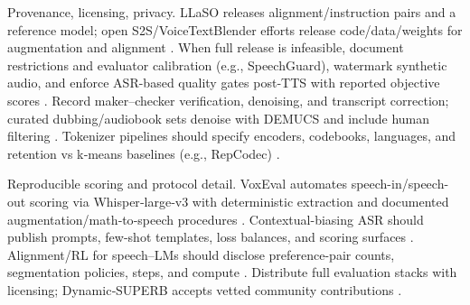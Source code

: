 \documentclass{article}
\begin{document}
Provenance, licensing, privacy. LLaSO releases alignment/instruction pairs and a reference model; open S2S/VoiceTextBlender efforts release code/data/weights for augmentation and alignment \cite{sun2025llasofoundationalframeworkreproduciblere,peng2025voicetextblenderaugmentinglargelanguagem}. When full release is infeasible, document restrictions and evaluator calibration (e.g., SpeechGuard), watermark synthetic audio, and enforce ASR-based quality gates post‑TTS with reported objective scores \cite{peri2024speechguardexploringadversarialrobustnes,zhao2024advancingspeechlanguagemodelsscalingsupe}. Record maker–checker verification, denoising, and transcript correction; curated dubbing/audiobook sets denoise with DEMUCS and include human filtering \cite{huang2023holisticcascadesystembenchmarkhumanevalu}. Tokenizer pipelines should specify encoders, codebooks, languages, and retention vs k‑means baselines (e.g., RepCodec) \cite{huang2024repcodecspeechrepresentationcodectokeniz}.

Reproducible scoring and protocol detail. VoxEval automates speech-in/speech-out scoring via Whisper‑large‑v3 with deterministic extraction and documented augmentation/math‑to‑speech procedures \cite{cui2025voxevalbenchmarkingknowledgeunderstandin}. Contextual-biasing ASR should publish prompts, few-shot templates, loss balances, and scoring surfaces \cite{sun2023contextualbiasingnamedentitieslargelangu}. Alignment/RL for speech–LMs should disclose preference-pair counts, segmentation policies, steps, and compute \cite{lin2025alignslmtextlessspokenlanguagemodelsrein}. Distribute full evaluation stacks with licensing; Dynamic‑SUPERB accepts vetted community contributions \cite{huang2025dynamicsuperbphase2collaborativelyexpand}.
\end{document}
